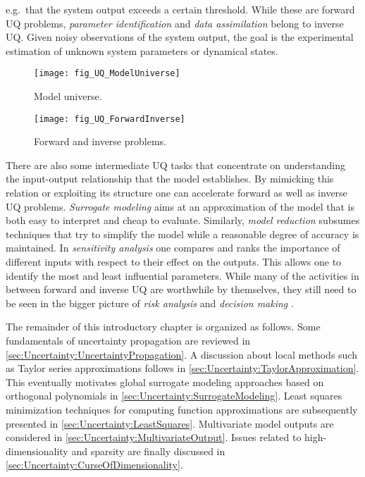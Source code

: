 e.g.\ that the system output exceeds a certain threshold.
While these are forward UQ problems, \emph{parameter identification} \cite{Inversion:Tarantola2005,Inversion:Kaipio2005}
and \emph{data assimilation} \cite{Bayesian:Kalnay2002,Bayesian:Evensen2009} belong to inverse UQ.
Given noisy observations of the system output, the goal is the experimental estimation of unknown system parameters or dynamical states.
\begin{figure}[htbp]
  \begin{minipage}[c]{0.58\textwidth}
    \centering
    \texttt{[image: fig\_UQ\_ModelUniverse]}
    \caption[Model universe]{Model universe.}
    \label{fig:UQ:ModelUniverse}
  \end{minipage}%
  \hfill%
  \begin{minipage}[c]{0.38\textwidth}
    \centering
    \texttt{[image: fig\_UQ\_ForwardInverse]}
    \caption[Forward and inverse problems]{Forward and inverse problems.}
    \label{fig:UQ:ForwardInverse}
  \end{minipage}%
\end{figure}
\par %
There are also some intermediate UQ tasks that concentrate on understanding the input-output relationship that the model establishes.
By mimicking this relation or exploiting its structure one can accelerate forward as well as inverse UQ problems.
\emph{Surrogate modeling} \cite{Kriging:Fang2006,Kriging:Forrester2008} aims at an approximation of the model that is both easy to interpret and cheap to evaluate.
Similarly, \emph{model reduction} \cite{Uncertainty:Qu2004,Uncertainty:Antoulas2005}
subsumes techniques that try to simplify the model while a reasonable degree of accuracy is maintained.
In \emph{sensitivity analysis} \cite{Uncertainty:Saltelli2004,Uncertainty:Saltelli2008} one compares and ranks the importance of different inputs with respect to their effect on the outputs.
This allows one to identify the most and least influential parameters.
While many of the activities in between forward and inverse UQ are worthwhile by themselves, they still need to be seen in the bigger picture of
\emph{risk analysis} \cite{Uncertainty:Bedford2001,Uncertainty:Aven2012} and \emph{decision making} \cite{Uncertainty:Herrmann2015,Uncertainty:Kochenderfer2015}.
\par %
The remainder of this introductory chapter is organized as follows.
Some fundamentals of uncertainty propagation are reviewed in \cref{sec:Uncertainty:UncertaintyPropagation}.
A discussion about local methods such as Taylor series approximations follows in \cref{sec:Uncertainty:TaylorApproximation}.
This eventually motivates global surrogate modeling approaches based on orthogonal polynomials in \cref{sec:Uncertainty:SurrogateModeling}.
Least squares minimization techniques for computing function approximations are subsequently presented in \cref{sec:Uncertainty:LeastSquares}.
Multivariate model outputs are considered in \cref{sec:Uncertainty:MultivariateOutput}.
Issues related to high-dimensionality and sparsity are finally discussed in \cref{sec:Uncertainty:CurseOfDimensionality}.